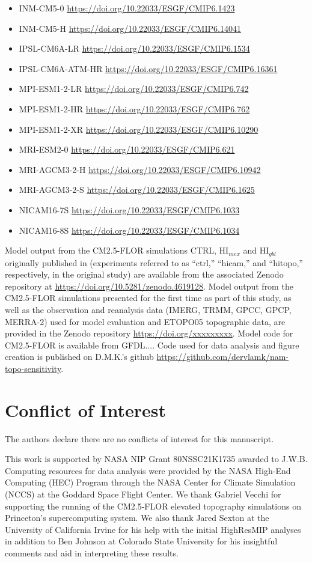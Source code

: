 \documentclass[draft]{agujournal2019}
\begin{document}
\begin{itemize}
    \item INM-CM5-0 \url{https://doi.org/10.22033/ESGF/CMIP6.1423} %
    \item INM-CM5-H \url{https://doi.org/10.22033/ESGF/CMIP6.14041}
    \item IPSL-CM6A-LR \url{https://doi.org/10.22033/ESGF/CMIP6.1534} %
    \item IPSL-CM6A-ATM-HR \url{https://doi.org/10.22033/ESGF/CMIP6.16361}
    \item MPI-ESM1-2-LR \url{https://doi.org/10.22033/ESGF/CMIP6.742} %
    \item MPI-ESM1-2-HR \url{https://doi.org/10.22033/ESGF/CMIP6.762}
    \item MPI-ESM1-2-XR \url{https://doi.org/10.22033/ESGF/CMIP6.10290}
    \item MRI-ESM2-0 \url{https://doi.org/10.22033/ESGF/CMIP6.621} %
    \item MRI-AGCM3-2-H \url{https://doi.org/10.22033/ESGF/CMIP6.10942}
    \item MRI-AGCM3-2-S \url{https://doi.org/10.22033/ESGF/CMIP6.1625}
    \item NICAM16-7S \url{https://doi.org/10.22033/ESGF/CMIP6.1033}
    \item NICAM16-8S \url{https://doi.org/10.22033/ESGF/CMIP6.1034}
\end{itemize}

Model output from the CM2.5-FLOR simulations CTRL, HI$_{mex}$ and HI$_{gbl}$ originally published in  (experiments referred to as ``ctrl,'' ``hicam,'' and ``hitopo,'' respectively, in the original study) are available from the associated Zenodo repository at \url{https://doi.org/10.5281/zenodo.4619128}. Model output from the CM2.5-FLOR simulations presented for the first time as part of this study, as well as the observation and reanalysis data (IMERG, TRMM, GPCC, GPCP, MERRA-2) used for model evaluation and ETOPO05 topographic data, are provided in the Zenodo repository \url{https://doi.org/xxxxxxxxx}. Model code for CM2.5-FLOR is available from GFDL.... Code used for data analysis and figure creation is published on D.M.K.'s github \url{https://github.com/dervlamk/nam-topo-sensitivity}. 

\section*{Conflict of Interest}
The authors declare there are no conflicts of interest for this manuscript.

\acknowledgments
This work is supported by NASA NIP Grant 80NSSC21K1735 awarded to J.W.B. Computing resources for data analysis were provided by the NASA High-End Computing (HEC) Program through the NASA Center for Climate Simulation (NCCS) at the Goddard Space Flight Center.  We thank Gabriel Vecchi for supporting the running of the CM2.5-FLOR elevated topography simulations on Princeton's supercomputing system. We also thank Jared Sexton at the University of California Irvine for his help with the initial HighResMIP analyses in addition to Ben Johnson at Colorado State University for his insightful comments and aid in interpreting these results.


\end{document}
